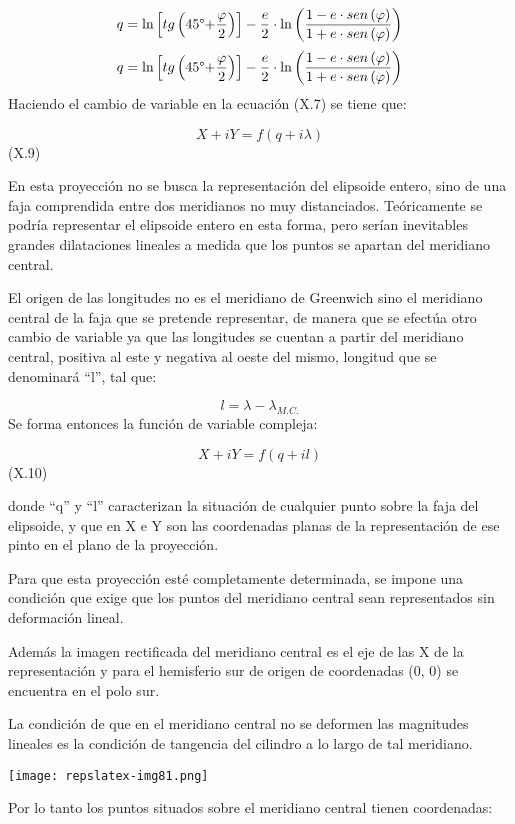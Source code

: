 \documentclass[]{article}
\begin{document}
\[q=\text{ln}\left[tg\left(\text{45}\text{{\textdegree}+}\frac{\varphi
}{2}\right)\right]-\frac{e}{2}\cdot \text{ln}\left(\frac{1-e\cdot
sen\left(\varphi \right)}{1+e\cdot
sen\left(\varphi \right)}\right)\]
\[q=\text{ln}\left[tg\left(\text{45}\text{{\textdegree}+}\frac{\varphi
}{2}\right)\right]-\frac{e}{2}\cdot \text{ln}\left(\frac{1-e\cdot
sen\left(\varphi \right)}{1+e\cdot
sen\left(\varphi \right)}\right)\] Haciendo el cambio de variable en la
ecuación (X.7) se tiene que:

\[X+iY=f\left(q+\mathit{i\lambda
}\right)\] (X.9)

En esta proyección no se busca la representación del elipsoide entero,
sino de una faja comprendida entre dos meridianos no muy distanciados.
Teóricamente se podría representar el elipsoide entero en esta forma,
pero serían inevitables grandes dilataciones lineales a medida que los
puntos se apartan del meridiano central.

El origen de las longitudes no es el meridiano de Greenwich sino el
meridiano central de la faja que se pretende representar, de manera que
se efectúa otro cambio de variable ya que las longitudes se cuentan a
partir del meridiano central, positiva al este y negativa al oeste del
mismo, longitud que se denominará ``l'', tal que:

\[l=\lambda -\lambda _{M\text{.}C\text{.}}\] Se forma entonces la
función de variable compleja:

\[X+iY=f\left(q+il\right)\] (X.10)

donde ``q'' y ``l'' caracterizan la situación de cualquier punto sobre
la faja del elipsoide, y que en X e Y son las coordenadas planas de la
representación de ese pinto en el plano de la proyección.

Para que esta proyección esté completamente determinada, se impone una
condición que exige que los puntos del meridiano central sean
representados sin deformación lineal.

Además la imagen rectificada del meridiano central es el eje de las X de
la representación y para el hemisferio sur de origen de coordenadas (0,
0) se encuentra en el polo sur.

La condición de que en el meridiano central no se deformen las
magnitudes lineales es la condición de tangencia del cilindro a lo largo
de tal meridiano.

\texttt{[image: repslatex-img81.png]}

Por lo tanto los puntos situados sobre el meridiano central tienen
coordenadas:
\end{document}
